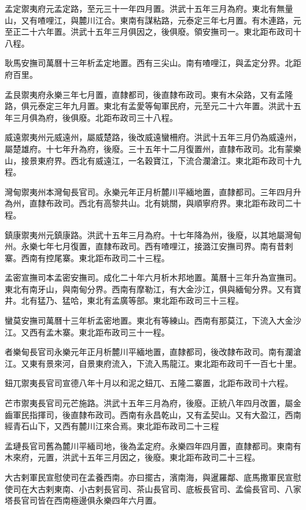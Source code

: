 孟定禦夷府元孟定路，至元三十一年四月置。洪武十五年三月為府。東北有無量山，又有喳哩江，與麓川江合。東南有謀粘路，元泰定三年七月置。有木連路，元至正二十六年置。洪武十五年三月俱因之，後俱廢。領安撫司一。東北距布政司十八程。

耿馬安撫司萬曆十三年析孟定地置。西有三尖山。南有喳哩江，與孟定分界。北距府百里。

孟艮禦夷府永樂三年七月置，直隸都司，後直隸布政司。東有木朵路，又有孟隆路，俱元泰定三年九月置。東北有孟愛等甸軍民府，元至元二十六年置。洪武十五年三月俱為府，後俱廢。北距布政司三十八程。

威遠禦夷州元威遠州，屬威楚路，後改威遠蠻柵府。洪武十五年三月仍為威遠州，屬楚雄府。十七年升為府，後廢。三十五年十二月復置州，直隸布政司。北有蒙樂山，接景東府界。西北有威遠江，一名穀寶江，下流合瀾滄江。東北距布政司十九程。

灣甸禦夷州本灣甸長官司。永樂元年正月析麓川平緬地置，直隸都司。三年四月升為州，直隸布政司。西北有高黎共山。北有姚關，與順寧府界。東北距布政司二十程。

鎮康禦夷州元鎮康路。洪武十五年三月為府。十七年降為州，後廢，以其地屬灣甸州。永樂七年七月復置，直隸布政司。西有喳哩江，接潞江安撫司界。南有昔剌寨。西南有控尾寨。東北距布政司二十三程。

孟密宣撫司本孟密安撫司。成化二十年六月析木邦地置。萬曆十三年升為宣撫司。東北有南牙山，與南甸分界。西南有摩勒江，有大金沙江，俱與緬甸分界。又有寶井。北有猛乃、猛哈，東北有孟廣等部。東北距布政司三十三程。

蠻莫安撫司萬曆十三年析孟密地置。東北有等練山。西南有那莫江，下流入大金沙江。又西有孟木寨。東北距布政司三十一程。

者樂甸長官司永樂元年正月析麓川平緬地置，直隸都司，後改隸布政司。南有瀾滄江。又東有景來河，自景東府流入，下流入馬龍江。東北距布政司千一百七十里。

鈕兀禦夷長官司宣德八年十月以和泥之鈕兀、五隆二寨置，北距布政司十六程。

芒市禦夷長官司元芒施路。洪武十五年三月為府，後廢。正統八年四月改置，屬金齒軍民指揮司，後直隸布政司。西南有永昌乾山，又有孟契山。又有大盈江，西南經青石山下，又西有麓川江來合焉。東北距布政司二十三程

孟璉長官司舊為麓川平緬司地，後為孟定府。永樂四年四月置，直隸都司。東南有木來府，元置，洪武十五年三月因之，後廢。東北距布政司二十三程。

大古剌軍民宣慰使司在孟養西南。亦曰擺古，濱南海，與暹羅鄰、底馬撒軍民宣慰使司在大古剌東南、小古剌長官司、茶山長官司、底板長官司、孟倫長官司、八家塔長官司皆在西南極邊俱永樂四年六月置。


